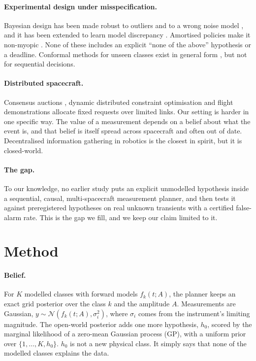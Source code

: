 \documentclass{jaa}
\begin{document}
\paragraph{Experimental design under misspecification.} Bayesian design has been made robust to outliers and to a wrong noise model \citep{Barlas2025,Catanach2023}, and it has been extended to learn model discrepancy \citep{Yang2025}. Amortised policies make it non-myopic \citep{Foster2021,Hedman2025}. None of these includes an explicit ``none of the above'' hypothesis or a deadline. Conformal methods for unseen classes exist in general form \citep{Xie2025}, but not for sequential decisions.

\paragraph{Distributed spacecraft.} Consensus auctions \citep{Choi2009,Perone2026}, dynamic distributed constraint optimisation \citep{Zilberstein2026} and flight demonstrations \citep{Adams2024} allocate fixed requests over limited links. Our setting is harder in one specific way. The value of a measurement depends on a belief about what the event is, and that belief is itself spread across spacecraft and often out of date. Decentralised information gathering in robotics \citep{Atanasov2015} is the closest in spirit, but it is closed-world.

\paragraph{The gap.} To our knowledge, no earlier study puts an explicit unmodelled hypothesis inside a sequential, causal, multi-spacecraft measurement planner, and then tests it against preregistered hypotheses on real unknown transients with a certified false-alarm rate. This is the gap we fill, and we keep our claim limited to it.

\section{Method}\label{sec:method}

\paragraph{Belief.} For $K$ modelled classes with forward models $f_k(t;A)$, the planner keeps an exact grid posterior over the class $k$ and the amplitude $A$. Measurements are Gaussian, $y\sim\mathcal N(f_k(t;A),\sigma_i^2)$, where $\sigma_i$ comes from the instrument's limiting magnitude. The open-world posterior adds one more hypothesis, $h_0$, scored by the marginal likelihood of a zero-mean Gaussian process (GP), with a uniform prior over $\{1,\dots,K,h_0\}$. $h_0$ is not a new physical class. It simply says that none of the modelled classes explains the data.
\end{document}
